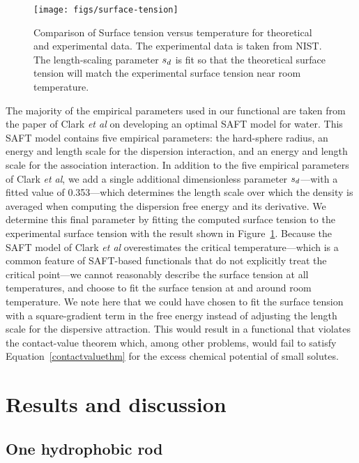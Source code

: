 \documentclass[twocolumn,amsmath,amssymb,prb]{revtex4-1}
\begin{document}
\begin{figure}
\begin{center}
\texttt{[image: figs/surface-tension]}
\end{center}
\caption{Comparison of Surface tension versus temperature for theoretical and
  experimental data. The experimental data is taken from NIST.\cite{nistwater}
  The length-scaling parameter $s_d$ is fit so that the theoretical surface 
  tension will match the experimental surface tension near room temperature.}
\label{fig:surface-tension}
\end{figure}

The majority of the empirical parameters used in our functional are
taken from the paper of Clark \emph{et al} on developing an optimal
SAFT model for water\cite{clark2006developing}.  This SAFT model
contains five empirical parameters: the hard-sphere radius, an energy
and length scale for the dispersion interaction, and an energy and
length scale for the association interaction.  In addition to the five
empirical parameters of Clark \emph{et al}, we add a single additional
dimensionless parameter $s_d$---with a fitted value of
0.353---which determines the length scale over which the density is
averaged when computing the dispersion free energy and its derivative.
We determine this final parameter by fitting the computed surface
tension to the experimental surface tension with the result shown in
Figure~\ref{fig:surface-tension}.  Because the SAFT model of Clark
\emph{et al} overestimates the critical temperature---which is a
common feature of SAFT-based functionals that do not explicitly treat
the critical point---we cannot reasonably describe the surface tension
at all temperatures, and choose to fit the surface tension at and
around room temperature.  We note here that we could have chosen to
fit the surface tension with a square-gradient term in the free energy
instead of adjusting the length scale for the dispersive attraction.
This would result in a functional that violates the contact-value
theorem which, among other problems, would fail to satisfy
Equation~\ref{contactvaluethm} for the excess chemical potential of
small solutes.

\section{Results and discussion}

\subsection{One hydrophobic rod}
\end{document}
